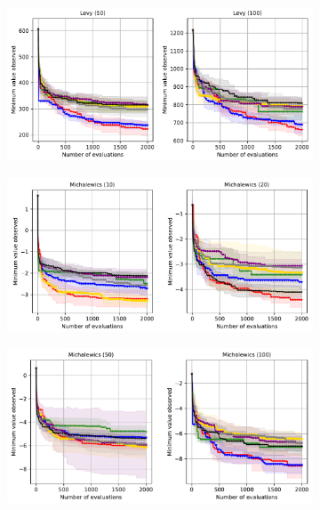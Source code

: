 \begin{figure}[htbp]
    \centering
    \begin{subfigure}[b]{0.8\textwidth}  
        \centering
        \includegraphics[width=\textwidth]{Figures/Neural-BO/L2.pdf}
    \end{subfigure}
    \vspace{0.5cm} %

    \begin{subfigure}[b]{0.8\textwidth} 
        \centering
        \includegraphics[width=\textwidth]{Figures/Neural-BO/M1.pdf}
    \end{subfigure}

    \begin{subfigure}[b]{0.8\textwidth} 
        \centering
        \includegraphics[width=\textwidth]{Figures/Neural-BO/M2.pdf}
    \end{subfigure}


\end{figure}

